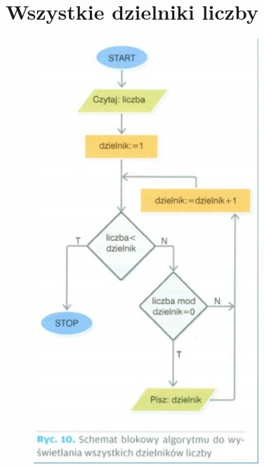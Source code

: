 \documentclass[a4paper,11pt]{article}
\begin{document}
\section{Wszystkie dzielniki liczby}
\begin{figure}[ht]
\centering
\includegraphics[height=16cm]{rys9}
\end{figure}
\newpage
\end{document}
